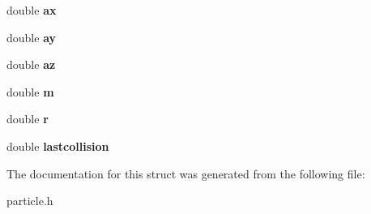 \begin{DoxyCompactItemize}
\item 
\hypertarget{structparticle_ab4aac66a4397decdeb9e444034a4e3ff}{
double {\bfseries ax}}
\label{structparticle_ab4aac66a4397decdeb9e444034a4e3ff}

\item 
\hypertarget{structparticle_a036303a295b667495c5b107fbb33a80e}{
double {\bfseries ay}}
\label{structparticle_a036303a295b667495c5b107fbb33a80e}

\item 
\hypertarget{structparticle_ae490dfd57d15896d6c16c289999d0b98}{
double {\bfseries az}}
\label{structparticle_ae490dfd57d15896d6c16c289999d0b98}

\item 
\hypertarget{structparticle_a4cb4f184e6cd2b5dc0dc555d14f265dd}{
double {\bfseries m}}
\label{structparticle_a4cb4f184e6cd2b5dc0dc555d14f265dd}

\item 
\hypertarget{structparticle_a9ba64d6fa0d4bda34688d54a05341b77}{
double {\bfseries r}}
\label{structparticle_a9ba64d6fa0d4bda34688d54a05341b77}

\item 
\hypertarget{structparticle_af266c2458f692078375791567c133b23}{
double {\bfseries lastcollision}}
\label{structparticle_af266c2458f692078375791567c133b23}

\end{DoxyCompactItemize}


The documentation for this struct was generated from the following file:\begin{DoxyCompactItemize}
\item 
particle.h\end{DoxyCompactItemize}
